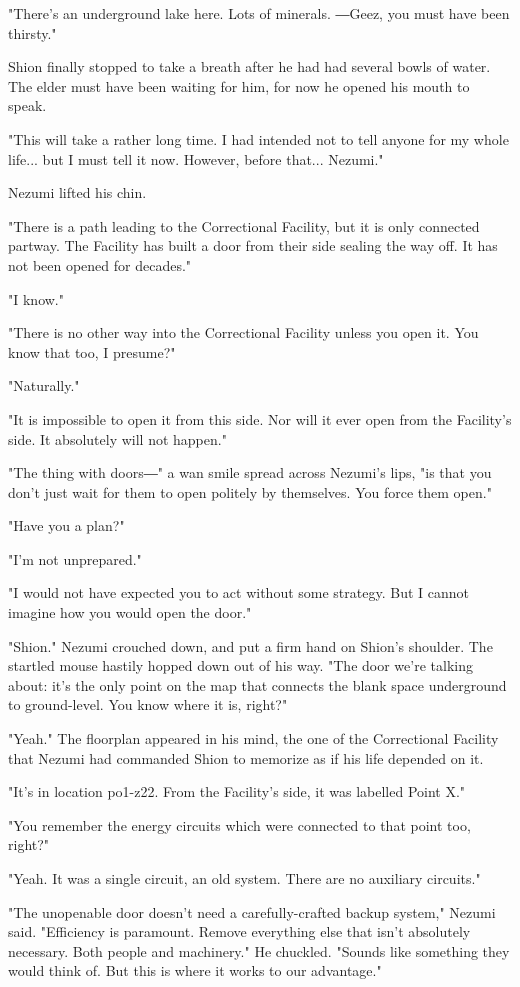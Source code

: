 "There's an underground lake here. Lots of minerals. ―Geez, you must
have been thirsty."

Shion finally stopped to take a breath after he had had several bowls of
water. The elder must have been waiting for him, for now he opened his
mouth to speak.

"This will take a rather long time. I had intended not to tell anyone
for my whole life... but I must tell it now. However, before that...
Nezumi."

Nezumi lifted his chin.

"There is a path leading to the Correctional Facility, but it is only
connected partway. The Facility has built a door from their side sealing
the way off. It has not been opened for decades."

"I know."

"There is no other way into the Correctional Facility unless you open
it. You know that too, I presume?"

"Naturally."

"It is impossible to open it from this side. Nor will it ever open from
the Facility's side. It absolutely will not happen."

"The thing with doors―" a wan smile spread across Nezumi's lips, "is
that you don't just wait for them to open politely by themselves. You
force them open."

"Have you a plan?"

"I'm not unprepared."

"I would not have expected you to act without some strategy. But I
cannot imagine how you would open the door."

"Shion." Nezumi crouched down, and put a firm hand on Shion's shoulder.
The startled mouse hastily hopped down out of his way. "The door we're
talking about: it's the only point on the map that connects the blank
space underground to ground-level. You know where it is, right?"

"Yeah." The floorplan appeared in his mind, the one of the Correctional
Facility that Nezumi had commanded Shion to memorize as if his life
depended on it.

"It's in location po1-z22. From the Facility's side, it was labelled
Point X."

"You remember the energy circuits which were connected to that point
too, right?"

"Yeah. It was a single circuit, an old system. There are no auxiliary
circuits."

"The unopenable door doesn't need a carefully-crafted backup system,"
Nezumi said. "Efficiency is paramount. Remove everything else that isn't
absolutely necessary. Both people and machinery." He chuckled. "Sounds
like something they would think of. But this is where it works to our
advantage."

